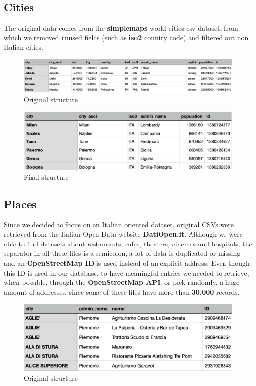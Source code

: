 \documentclass{article}[IEEEtran]
\begin{document}
\subsection{Cities}

The original data comes from the \textbf{simplemaps}\cite{simplemaps} world cities csv dataset, from which we removed unused fields (such as \textbf{iso2} country code) and filtered out non Italian cities.  

\begin{figure}[H]
\begin{center}
\includegraphics[width=0.5\linewidth, frame]{cities-w_original.png}
\caption{Original structure}
\end{center}
\end{figure}

\begin{figure}[H]
\begin{center}
\includegraphics[width=0.5\linewidth, frame]{cities.png}
\caption{Final structure}
\end{center}
\end{figure}


\subsection{Places}

Since we decided to focus on an Italian oriented dataset, original CSVs were retrieved from the Italian Open Data website \textbf{DatiOpen.it}\cite{datiopen}. Although we were able to find datasets about restaurants, cafes, theaters, cinemas and hospitals, the separator in all these files is a semicolon, a lot of data is duplicated or missing and an \textbf{OpenStreetMap ID} is used instead of an explicit address. Even though this ID is used in our database, to have meaningful entries we needed to retrieve, when possible, through the \textbf{OpenStreetMap API}, or pick randomly, a huge amount of addresses, since some of these files have more than \textbf{30.000} records.



\begin{figure}[H]
\begin{center}
\includegraphics[width=0.5\linewidth, frame]{restaurants_original.png}
\caption{Original structure}
\end{center}
\end{figure}
\end{document}
